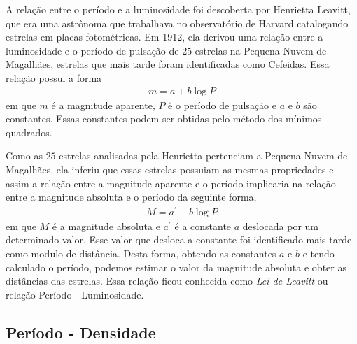 A relação entre o período e a luminosidade foi descoberta por Henrietta Leavitt, que  era uma astrônoma que trabalhava no observatório de Harvard catalogando estrelas em placas fotométricas. Em 1912, ela derivou uma relação entre a luminosidade e o período de pulsação de $25$ estrelas na Pequena Nuvem de Magalhães, estrelas que mais tarde foram identificadas como Cefeidas. Essa relação possui a forma
\begin{align}
m = a + b \log P \label{eq:leavitt_law}
\end{align}
em que $m$ é a magnitude aparente, $P$ é o período de pulsação e $a$ e $b$ são constantes. Essas constantes podem ser obtidas pelo método dos mínimos quadrados.

Como as $25$ estrelas analisadas pela Henrietta pertenciam a Pequena Nuvem de Magalhães, ela inferiu que essas estrelas possuiam as mesmas propriedades e assim a relação entre a magnitude aparente e o período implicaria na relação entre a magnitude absoluta e o período da seguinte forma,
\begin{align}
M = a^\prime + b \log P
\end{align}
em que $M$ é a magnitude absoluta e $a^\prime$ é a constante $a$ deslocada por um determinado valor. Esse valor que desloca a constante foi identificado mais tarde como modulo de distância. Desta forma, obtendo as constantes $a$ e $b$ e tendo calculado o período, podemos estimar o valor da magnitude absoluta e obter as distâncias das estrelas. Essa relação ficou conhecida como \textit{Lei de Leavitt} ou relação Período - Luminosidade.

\subsection{Período - Densidade}

